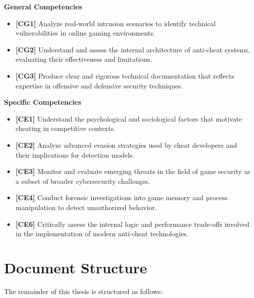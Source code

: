 \noindent\textbf{General Competencies}
\begin{itemize}
    \item \textbf{[CG1]} Analyze real-world intrusion scenarios to identify technical vulnerabilities in online gaming environments.
    \item \textbf{[CG2]} Understand and assess the internal architecture of anti-cheat systems, evaluating their effectiveness and limitations.
    \item \textbf{[CG3]} Produce clear and rigorous technical documentation that reflects expertise in offensive and defensive security techniques.
\end{itemize}

\newpage

\noindent\textbf{Specific Competencies}
\begin{itemize}
    \item \textbf{[CE1]} Understand the psychological and sociological factors that motivate cheating in competitive contexts.
    \item \textbf{[CE2]} Analyze advanced evasion strategies used by cheat developers and their implications for detection models.
    \item \textbf{[CE3]} Monitor and evaluate emerging threats in the field of game security as a subset of broader cybersecurity challenges.
    \item \textbf{[CE4]} Conduct forensic investigations into game memory and process manipulation to detect unauthorized behavior.
    \item \textbf{[CE6]} Critically assess the internal logic and performance trade-offs involved in the implementation of modern anti-cheat technologies.
\end{itemize}

\section*{Document Structure}

The remainder of this thesis is structured as follows:

